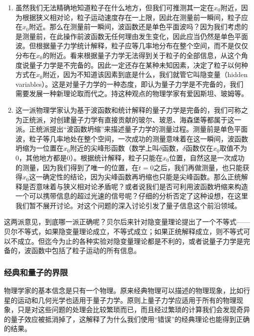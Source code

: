 \begin{enumerate}
\item 

虽然我们无法精确地知道粒子在什么地方，但我们可推测其一定在$x_0$附近，因为根据狭义相对论，粒子运动速度存在一上限，因此在测量前一瞬间，粒子应在$x_0$附近。那么在测量前一瞬间，波函数还是单色平面波吗？因为我们考虑的是测量前，在此操作前波函数无任何理由发生变化，因此应当仍然是单色平面波。但根据量子力学统计解释，粒子应等几率地分布在整个空间，而不是仅仅分布在$x_0$的附近。看来根据量子力学无法得到关于粒子的全部信息，从这个角度说量子力学是不完备的。因此一定还存在某种未知因素，决定了粒子以何种方式在$x_0$附近，因为不知道该因素到底是什么，我们就管它叫隐变量（hidden variables）。这是对量子力学的一种态度，即认为量子力学是不完备的，我们需要发展一种新理论取而代之。持这种观点的物理学家有爱因斯坦、玻姆等。

\item

这一派物理学家认为基于波函数和统计解释的量子力学是完备的，我们可称之为正统派，对创建量子力学有直接贡献的玻尔、玻恩、海森堡等都属于这一派。正统派提出“波函数坍缩”来描述量子力学的测量过程。测量前是单色平面波，粒子等几率地处在整个空间，一次成功的测量意味着在这一瞬间，波函数坍缩为一位置在$x_0$附近的尖峰形函数（数学上叫$\delta$函数，$\delta$函数仅在$x_0$取值不为0，其他地方都是0）。根据统计解释，粒子只能在$x_0$位置，自然这是一次成功的测量，因为我们得到了唯一的位置，在$t=0$之后，我们再做测量，也只能获得$x_0$这一确定性的结论，因为尖峰函数再坍缩也只能是尖峰函数。那么正统解释是否意味着与狭义相对论矛盾呢？或者说我们是否可利用波函数坍缩来构造一个可以携带信息的超过光速的信号呢？仔细的分析否定了这种设想，在这里我们暂不展开讨论。对这个问题的深入讨论引发了量子信息这个前沿领域。

\end{enumerate}

这两派意见，到底哪一派正确呢？贝尔后来针对隐变量理论提出了一个不等式——贝尔不等式，如果隐变量理论成立，不等式成立；如果正统解释成立，则不等式可以不成立。但迄今为止的各种实验对隐变量理论都是不利的，或者说量子力学是完备的，波函数中包括了粒子运动的所有信息。

\subsubsection{经典和量子的界限}

物理学家的基本信念是只有一个物理。原来经典物理可以描述的物理现象，比如行星的运动和几何光学也适用于量子力学。原则上量子力学应适用于所有的物理现象，只是对这些问题的处理会比较繁琐而已，而且经过繁琐的计算我们会发现奇异的量子效应被抵消掉了，这解释了为什么我们使用“错误”的经典理论也能得到正确的结果。

